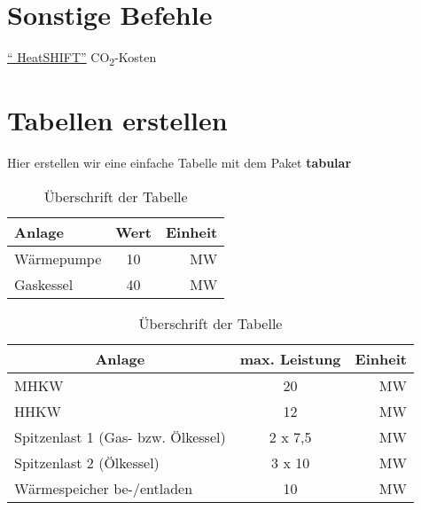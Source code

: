 \section{Sonstige Befehle}
\href{https://forschung.hs-kempten.de/de/forschungsprojekt/482-heatshift}{\enquote{ HeatSHIFT}}
CO\textsubscript{2}-Kosten

\section{Tabellen erstellen}
Hier erstellen wir eine einfache Tabelle mit dem Paket \textbf{tabular}\\
\begin{table}[H]
	\centering
	\caption[Überschrift für Tabellenverzeichnis]{Überschrift der Tabelle}
	\label{tab:tabelle_einfach}
	\begin{tabular}{|l|c|r|}\hline
		Anlage&Wert&Einheit\\\hline
		Wärmepumpe&10&MW\\\hline
		Gaskessel&40&MW\\\hline
	\end{tabular}
\end{table}

\begin{table}[H]
	\centering
	\caption[Überschrift für Tabellenverzeichnis]{Überschrift der Tabelle}
	\label{tab:tabelle_einfach}
	\begin{tabular}{|l|c|r|}\hline
		\multicolumn{1}{|c|}{\textbf{Anlage}}&\textbf{max. Leistung}&\textbf{Einheit}\\\hline
		MHKW&20 & MW\\\hline
		HHKW&12 & MW\\\hline
		Spitzenlast 1 (Gas- bzw. Ölkessel)& 2 x 7,5 & MW\\\hline
		Spitzenlast 2 (Ölkessel)& 3 x 10 & MW\\\hline
		Wärmespeicher be-/entladen& 10 & MW\\\hline
	\end{tabular}
\end{table}

